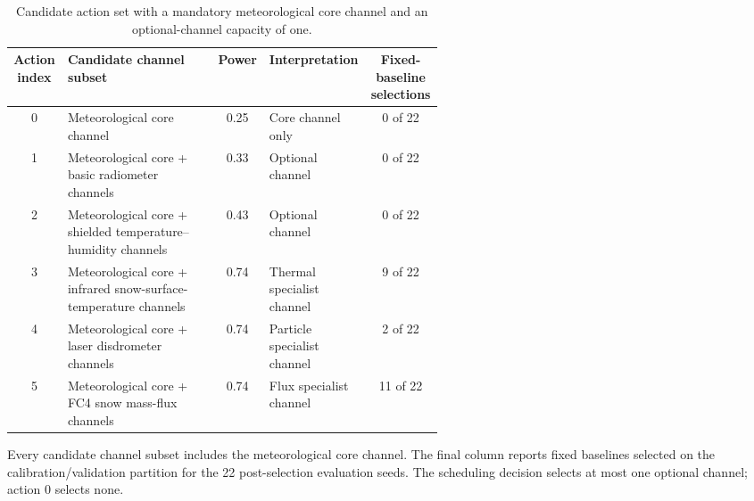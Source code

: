 \begin{table}[htbp]
  \centering
  \caption{Candidate action set with a mandatory meteorological core channel and an
  optional-channel capacity of one.}
  \label{tab:action_space_instantiation}
  \footnotesize
  \setlength{\tabcolsep}{3.0pt}
  \begin{tabular}{@{}c p{0.35\linewidth} c p{0.21\linewidth} c@{}}
    \toprule
    Action index & Candidate channel subset & Power & Interpretation & \shortstack{Fixed-baseline\\selections} \\
    \midrule
    0 & Meteorological core channel & 0.25 & Core channel only & 0 of 22 \\
    1 & Meteorological core + basic radiometer channels & 0.33 & Optional channel & 0 of 22 \\
    2 & Meteorological core + shielded temperature--humidity channels & 0.43 & Optional channel & 0 of 22 \\
    3 & Meteorological core + infrared snow-surface-temperature channels & 0.74 & Thermal specialist channel & 9 of 22 \\
    4 & Meteorological core + laser disdrometer channels & 0.74 & Particle specialist channel & 2 of 22 \\
    5 & Meteorological core + FC4 snow mass-flux channels & 0.74 & Flux specialist channel & 11 of 22 \\
    \bottomrule
  \end{tabular}
  \vspace{0.4ex}

  \noindent\footnotesize
  Every candidate channel subset includes the meteorological core channel. The final
  column reports fixed baselines selected on the calibration/validation partition for the 22
  post-selection evaluation seeds. The scheduling decision selects at most one
  optional channel; action 0 selects none.
\end{table}
